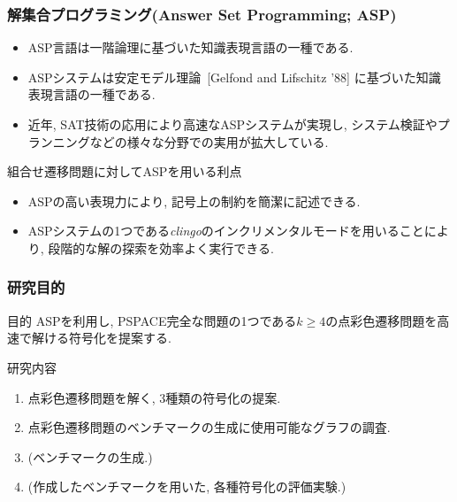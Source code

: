 \documentclass[dvipdfmx,11pt]{beamer}
\begin{document}
\begin{frame}\frametitle{解集合プログラミング(Answer Set Programming; ASP)}

  \begin{itemize}
    \item ASP言語は一階論理に基づいた知識表現言語の一種である.
    \item ASPシステムは安定モデル理論~[Gelfond and Lifschitz '88] 
          に基づいた知識表現言語の一種である. %
    \item 近年, SAT技術の応用により高速なASPシステムが実現し, システム検証やプランニングなどの様々な分野での実用が拡大している.
  \end{itemize}

  \begin{alertblock}{組合せ遷移問題に対してASPを用いる利点}
    \begin{itemize}
      \item ASPの高い表現力により, 記号上の制約を簡潔に記述できる.
      \item ASPシステムの1つである\textit{clingo}のインクリメンタルモードを用いることにより, 段階的な解の探索を効率よく実行できる.
    \end{itemize}
  \end{alertblock}
  
\end{frame}


\begin{frame}\frametitle{研究目的}
  \begin{alertblock}{目的}
    ASPを利用し, PSPACE完全な問題の1つである$k \ge 4$の点彩色遷移問題を高速で解ける符号化を提案する.
  \end{alertblock}

  \begin{block}{研究内容}
    \begin{enumerate}
      \item 点彩色遷移問題を解く, 3種類の符号化の提案.
      \item 点彩色遷移問題のベンチマークの生成に使用可能なグラフの調査.
      \item (ベンチマークの生成.)
      \item (作成したベンチマークを用いた, 各種符号化の評価実験.)
    \end{enumerate}
  \end{block}

\end{frame}
\end{document}
